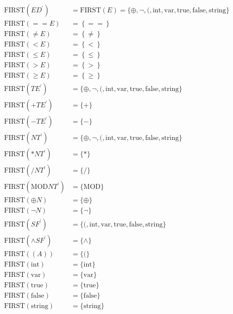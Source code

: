 \documentclass{report}
\begin{document}
\begin{itemize}
\begin{align*}
                \text{FIRST}(ED^{\prime}) &= \text{FIRST}(E) =  \{\oplus,\neg,(, \text{int}, \text{var}, \text{true}, \text{false}, \text{string}\} \\
                \text{FIRST}(==E) &= \left\{==\right\} \\
                \text{FIRST}(\ne E) &= \left\{\ne\right\} \\
                \text{FIRST}(<E) &= \left\{<\right\} \\
                \text{FIRST}(\leq E) &= \left\{\leq\right\} \\
                \text{FIRST}(>E) &= \left\{>\right\} \\
                \text{FIRST}(\geq E) &= \left\{\geq\right\} \\
                \text{FIRST}(TE^{\prime}) &= \{\oplus,\neg,(, \text{int}, \text{var}, \text{true}, \text{false}, \text{string}\}\\
                \text{FIRST}(+TE^{\prime}) &= \{+\}\\
                \text{FIRST}(-TE^{\prime}) &= \{-\}\\
                \text{FIRST}(NT^{\prime}) &= \{\oplus,\neg,(, \text{int}, \text{var}, \text{true}, \text{false}, \text{string}\}\\
                \text{FIRST}(*NT^{\prime}) &= \{*\}\\
                \text{FIRST}(/NT^{\prime}) &= \{/\}\\
                \text{FIRST}(\text{MOD}NT^{\prime}) &= \{\text{MOD}\}\\
                \text{FIRST}(\oplus N) &= \{\oplus\}\\
                \text{FIRST}(\neg N) &= \{\neg\} \\
                \text{FIRST}(SF^{\prime}) &= \{(, \text{int}, \text{var}, \text{true}, \text{false}, \text{string}\}\\
                \text{FIRST}(\land SF^{\prime}) &= \{\land\}\\
                \text{FIRST}((A)) &= \{(\}\\
                \text{FIRST}(\text{int}) &= \{\text{int}\}\\
                \text{FIRST}(\text{var}) &= \{\text{var}\} \\
                \text{FIRST}(\text{true}) &= \{\text{true}\} \\
                \text{FIRST}(\text{false}) &= \{\text{false}\} \\
                \text{FIRST}(\text{string}) &= \{\text{string}\}

\end{align*}
\end{itemize}
\end{document}
